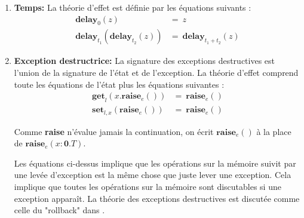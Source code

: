 \begin{exemple}
\begin{enumerate}
			\item[] \textbf{Temps:} La théorie d'effet est définie par les équations suivants :  
			\begin{align*}
				\textbf{delay}_0(z)  &=~z\\
				\textbf{delay}_{t_1}(\textbf{delay}_{t_2}(z)) &=~ \textbf{delay}_{t_1 + t_2}(z)
			\end{align*}
		
		
			\item[] \textbf{Exception destructrice:} La signature des exceptions destructives est l'union de la signature de l'état et de l'exception. La théorie d'effet comprend toute les équations de l'état plus les équations suivantes :  			
			\begin{align*}
				\textbf{get}_l(x.\textbf{raise}_e()) &=~\textbf{raise}_e()\\
				\textbf{set}_{l,x}(\textbf{raise}_{e}()) &=~\textbf{raise}_{e}()
			\end{align*}
		
			Comme \textbf{raise} n'évalue jamais la continuation, on écrit $\textbf{raise}_e()$ à la place de $\textbf{raise}_e(x:\textbf{0}.T)$.
			\bigbreak
			
			Les équations ci-dessus implique que les opérations sur la mémoire suivit par une levée d'exception est la même chose que juste lever une exception. Cela implique que toutes les opérations sur la mémoire sont discutables si une exception apparaît. La théorie des exceptions destructives est discutée comme celle du "rollback" dans \cite{DBLP:journals/tcs/HylandPP06}.
		\end{enumerate}
	\end{exemple}